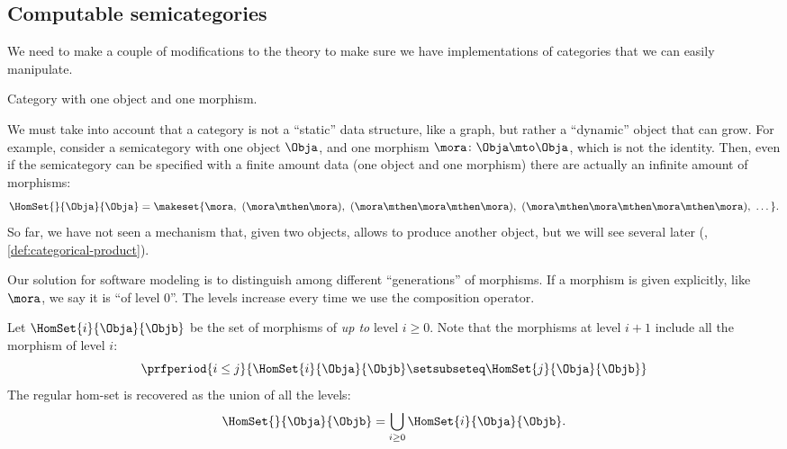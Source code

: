 \label{sec:exercise-semicategories}

\subsection{Computable semicategories}

We need to make a couple of modifications to the theory to make sure we have implementations of categories that we can easily manipulate.

\begin{marginfigure}
    \vspace{-1cm}
    \caption{Category with one object and one morphism.}
\end{marginfigure}

We must take into account that a category is not a ``static'' data structure, like a graph, but rather a ``dynamic'' object that can grow.
For example, consider a semicategory with one object $\Obja$, and one morphism $\mora\colon\Obja \mto \Obja$, which is not the identity.
Then, even if the semicategory can be specified with a finite amount data (one object and one morphism) there are actually an infinite amount of morphisms:
\begin{equation}
    \HomSet{}{\Obja}{\Obja} = \makeset{\mora,\ (\mora\mthen\mora),\ (\mora\mthen\mora\mthen\mora),\ (\mora\mthen\mora\mthen\mora\mthen\mora),\ \dots}.
\end{equation}
So far, we have not seen a mechanism that, given two objects, allows to produce another object, but we will see several later (\eg, \cref{def:categorical-product}).

Our solution for software modeling is to distinguish among different ``generations'' of morphisms.
If a morphism is given explicitly, like $\mora$, we say it is ``of level 0''.
The levels increase every time we use the composition operator.

Let $\HomSet{i}{\Obja}{\Objb}$ be the set of morphisms of \emph{up to} level $i\geq 0$.
Note that the morphisms at level $i+1$ include all the morphism of level $i$:
\begin{equation}
    \prfperiod{
        i \leq j
    }{
        \HomSet{i}{\Obja}{\Objb} \setsubseteq \HomSet{j}{\Obja}{\Objb}
    }
\end{equation}
The regular hom-set is recovered as the union of all the levels:
\begin{equation}
    \HomSet{}{\Obja}{\Objb} = \bigcup_{i\geq0} \HomSet{i}{\Obja}{\Objb}.
\end{equation}

